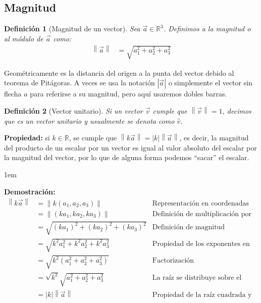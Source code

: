 \documentclass[12pt, fleqn]{report}                             %
\newenvironment{SmallIndentation}[1][0.75em]                    %
    {\begin{adjustwidth}{#1}{}\begin{footnotesize}}                 %
    {\end{footnotesize}\end{adjustwidth}}                           %
\newcommand{\abs}[1]{\left\lvert #1 \right\lvert}				%
\newcommand{\Abs}[1]{\left\lVert #1 \right\lVert}				%
\newtheorem{Definition}{Definición}[section]                    %
\newcommand{\ve}[1]{\vec{#1}}									%
\begin{document}
			\subsection{Magnitud}
			
			\begin{Definition}[Magnitud de un vector]
				Sea $\ve{a} \in \mathbb{R}^3$. Definimos a la magnitud o al módulo de $\ve{a}$ como:
				\begin{align}
					\Abs{\ve{a}} &= \sqrt{a_1^2 + a_2^2 + a_3^2}
				\end{align}
			\end{Definition}
		
			Geométricamente es la distancia del origen a la punta del vector debido al teorema de Pitágoras. A veces se usa la notación $\abs{\ve{a}}$ o simplemente el vector sin flecha $a$ para referirse a su magnitud, pero aquí usaremos dobles barras.
			
			\begin{Definition}[Vector unitario]
				Si un vector $\ve{v}$ cumple que $\Abs{\ve{v}}=1$, decimos que es un \emph{vector unitario} y usualmente se denota como $\hat{v}$.
			\end{Definition}
			
			\textbf{Propiedad:} si $k \in \mathbb{R}$, se cumple que $\Abs{k\ve{a}} = \abs{k} \Abs{\ve{a}}$, es decir, la magnitud del producto de un escalar por un vector es igual al valor absoluto del escalar por la magnitud del vector, por lo que de alguna forma podemos ``sacar'' el escalar.
			
			\begin{SmallIndentation}[1em]
				\textbf{Demostración:}
				\begin{align*}
					\Abs{k\ve{a}} &= \Abs{k(a_1, a_2, a_3)} &\mbox{Representación en coordenadas}\\
					&= \Abs{(ka_1, ka_2, ka_3)} &\mbox{Definición de multiplicación por escalar}\\
					&= \sqrt{(ka_1)^2 + (ka_2)^2 + (ka_3)^2} &\mbox{Definición de magnitud}\\
					&= \sqrt{k^2a_1^2 + k^2a_2^2 + k^2a_3^2} &\mbox{Propiedad de los exponentes en los reales}\\
					&= \sqrt{k^2(a_1^2 + a_2^2 + a_3^2)} &\mbox{Factorización}\\
					&= \sqrt{k^2}\sqrt{a_1^2 + a_2^2 + a_3^2} &\mbox{La raíz se distribuye sobre el producto de reales}\\
					&= \abs{k} \Abs{\ve{a}} &\mbox{Propiedad de la raíz cuadrada y definición de magnitud}
				\end{align*}
			\end{SmallIndentation}
		
\end{document}
